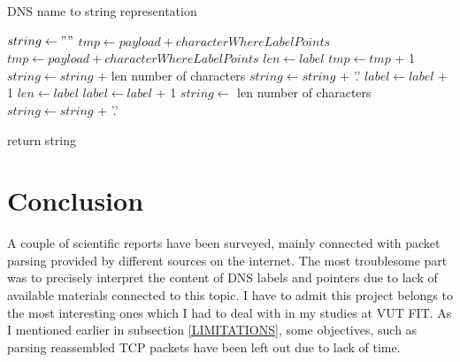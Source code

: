 \documentclass[11pt,a4paper]{article}
\begin{document}
\label{DNSNameToString}
\begin{algorithm}
    \caption{DNS name to string representation}
    \begin{algorithmic}

        \State $ string \gets "" $
                \State $ tmp \gets payload+characterWhereLabelPoints $
                        \State $ tmp \gets payload+characterWhereLabelPoints $
                    \EndIf
                    \State $ len \gets label $
                    \State $ tmp \gets tmp $ + 1
                    \State $ string \gets string $ + len number of characters
                    \State $ string \gets string$ + '.'
                \EndWhile
                \State $ label \gets label $ + 1
            \Else
                \State $ len \gets label $
                \State $ label \gets label $ + 1
                \State $ string \gets $ len number of characters
                \State $ string \gets string$ + '.'
            \EndIf

        \EndWhile
        \State return string
    \EndProcedure
    \end{algorithmic}
\end{algorithm}

\newpage


\section{Conclusion}

A couple of scientific reports have been surveyed, mainly connected with packet parsing provided by different sources on the internet. The most troublesome part was to precisely interpret the content of DNS labels and pointers due to lack of available materials connected to this topic. I have to admit this project belongs to the most interesting ones which I had to deal with in my studies at VUT FIT. As I mentioned earlier in subsection \ref{LIMITATIONS}, some objectives, such as parsing reassembled TCP packets have been left out due to lack of time.

\newpage %

\makeatletter
\makeatother

\begin{flushleft}
    
\end{flushleft}


\end{document}
